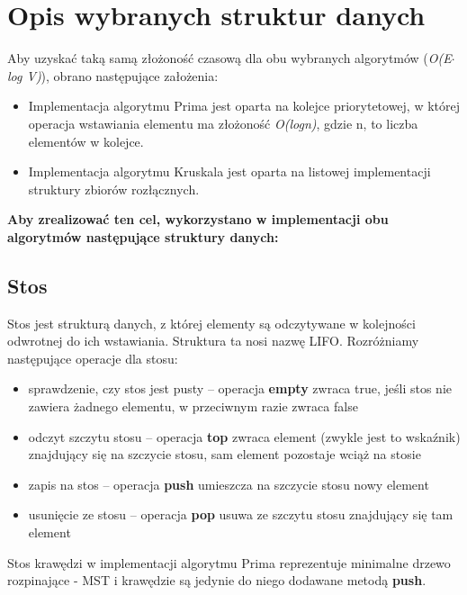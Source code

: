 \section{Opis wybranych struktur danych}
Aby uzyskać taką samą złożoność czasową dla obu wybranych algorytmów (\emph{O(E$\cdot$ log V)}), obrano następujące założenia: 
\begin{itemize}
	\item Implementacja algorytmu Prima jest oparta na kolejce priorytetowej, w której operacja wstawiania elementu ma złożoność \emph{O(logn)}, gdzie n, to liczba elementów w kolejce.
	\item Implementacja algorytmu Kruskala jest oparta na listowej implementacji struktury zbiorów rozłącznych.
\end{itemize}

\begin{center}
\textbf{Aby zrealizować ten cel, wykorzystano w implementacji obu algorytmów następujące struktury danych:}
\end{center}

\subsection{Stos}
Stos jest strukturą danych, z której elementy są odczytywane w kolejności odwrotnej do ich wstawiania. Struktura ta nosi nazwę LIFO. Rozróżniamy następujące operacje dla stosu:
\begin{itemize}
	\item sprawdzenie, czy stos jest pusty – operacja \textbf{empty} zwraca true, jeśli  stos nie zawiera żadnego elementu, w przeciwnym razie zwraca false
	\item odczyt szczytu stosu – operacja \textbf{top} zwraca element (zwykle jest to wskaźnik) znajdujący się na szczycie stosu, sam element pozostaje wciąż na stosie
	\item zapis na stos – operacja \textbf{push} umieszcza na szczycie stosu nowy element
	\item usunięcie ze stosu – operacja \textbf{pop} usuwa ze szczytu stosu znajdujący się tam element
\end{itemize}

Stos krawędzi w implementacji algorytmu Prima reprezentuje minimalne drzewo rozpinające - MST i krawędzie są jedynie do niego dodawane metodą \textbf{push}.\\

\newpage

